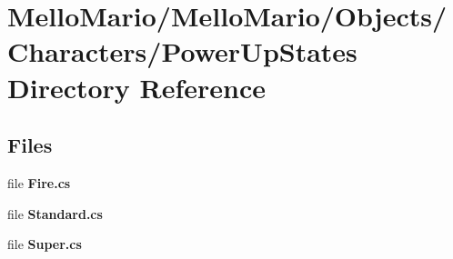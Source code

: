\section{Mello\+Mario/\+Mello\+Mario/\+Objects/\+Characters/\+Power\+Up\+States Directory Reference}
\label{dir_7683baf05460d3391d84401ccad61076}
\subsection*{Files}
\begin{DoxyCompactItemize}
\item 
file \textbf{ Fire.\+cs}
\item 
file \textbf{ Standard.\+cs}
\item 
file \textbf{ Super.\+cs}
\end{DoxyCompactItemize}
